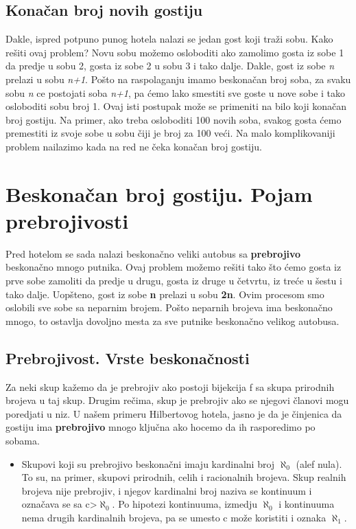 \documentclass[a4paper]{article}
\begin{document}
\subsection{Konačan broj novih gostiju}
Dakle, ispred potpuno punog hotela nalazi se jedan gost koji traži sobu. Kako rešiti ovaj problem?
Novu sobu možemo osloboditi ako zamolimo gosta iz sobe 1 da predje u sobu 2, gosta iz sobe 2 u sobu 3 i tako dalje. Dakle, gost iz sobe \textit{n} prelazi u sobu \textit{n+1}.
Pošto na raspolaganju imamo beskonačan broj soba, za svaku sobu \textit{n} ce postojati soba \textit{n+1}, pa ćemo lako smestiti sve goste u nove sobe i tako osloboditi sobu broj 1.
Ovaj isti postupak može se primeniti na bilo koji konačan broj gostiju. Na primer, ako treba osloboditi 100 novih soba, svakog gosta ćemo premestiti iz svoje sobe u sobu čiji je broj za 100 veći.
Na malo komplikovaniji problem nailazimo kada na red ne čeka konačan broj gostiju.

\newpage
\section{Beskonačan broj gostiju. Pojam prebrojivosti}
\label{sec:beskonačan broj gostiju}
Pred hotelom se sada nalazi beskonačno veliki autobus sa \textbf {prebrojivo} beskonačno mnogo putnika.
Ovaj problem možemo rešiti tako što ćemo gosta iz prve sobe zamoliti da predje u drugu, gosta iz druge u četvrtu, iz treće u šestu i tako dalje.
Uopšteno, gost iz sobe \textbf {n} prelazi u sobu \textbf {2n}. Ovim procesom smo oslobili sve sobe sa neparnim brojem.
Pošto neparnih brojeva ima beskonačno mnogo, to ostavlja dovoljno mesta za sve putnike beskonačno velikog autobusa.
\subsection {Prebrojivost. Vrste beskonačnosti}
Za neki skup kažemo da je prebrojiv ako postoji bijekcija f sa skupa prirodnih brojeva u taj skup.
Drugim rečima, skup je prebrojiv ako se njegovi članovi mogu poredjati u niz.
U našem primeru Hilbertovog hotela, jasno je da je činjenica da gostiju ima \textbf {prebrojivo} mnogo ključna ako hocemo da ih rasporedimo po sobama.
\begin {itemize}
\item Skupovi koji su prebrojivo beskonačni imaju kardinalni broj $\aleph_{0}$ (alef nula).
To su, na primer, skupovi prirodnih, celih i racionalnih brojeva.
Skup realnih brojeva nije prebrojiv, i njegov kardinalni broj naziva se kontinuum i označava se sa c>$\aleph_{0}$.
Po hipotezi kontinuuma, izmedju $\aleph_{0}$ i kontinuuma nema drugih kardinalnih brojeva, pa se umesto c može koristiti i oznaka $\aleph_{1}$.
\end {itemize}
\end{document}
